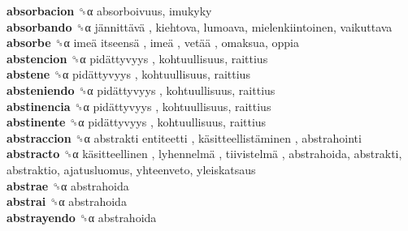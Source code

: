 \textbf{absorbacion} ␝α  absorboivuus, imukyky  \\
\textbf{absorbando} ␝α   jännittävä , kiehtova, lumoava, mielenkiintoinen, vaikuttava  \\
\textbf{absorbe} ␝α   imeä itseensä ,  imeä ,  vetää , omaksua, oppia  \\
\textbf{abstencion} ␝α   pidättyvyys , kohtuullisuus, raittius  \\
\textbf{abstene} ␝α   pidättyvyys , kohtuullisuus, raittius  \\
\textbf{absteniendo} ␝α   pidättyvyys , kohtuullisuus, raittius  \\
\textbf{abstinencia} ␝α   pidättyvyys , kohtuullisuus, raittius  \\
\textbf{abstinente} ␝α   pidättyvyys , kohtuullisuus, raittius  \\
\textbf{abstraccion} ␝α   abstrakti entiteetti ,  käsitteellistäminen , abstrahointi  \\
\textbf{abstracto} ␝α   käsitteellinen ,  lyhennelmä ,  tiivistelmä , abstrahoida, abstrakti, abstraktio, ajatusluomus, yhteenveto, yleiskatsaus  \\
\textbf{abstrae} ␝α  abstrahoida  \\
\textbf{abstrai} ␝α  abstrahoida  \\
\textbf{abstrayendo} ␝α  abstrahoida  \\
